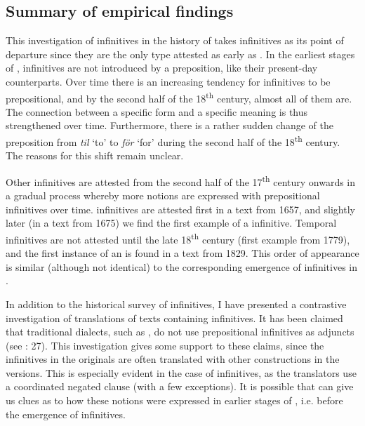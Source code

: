 \documentclass[output=paper]{langscibook}
\begin{document}
\subsection{Summary of empirical findings}\label{sec:kalm:4.4}


This investigation of  infinitives in the history of  takes  infinitives as its point of departure since they are the only type attested as early as . In the earliest stages of ,  infinitives are not introduced by a preposition, like their present-day counterparts. Over time there is an increasing tendency for  infinitives to be prepositional, and by the second half of the 18\textsuperscript{th} century, almost all of them are. The connection between a specific form and a specific meaning is thus strengthened over time. Furthermore, there is a rather sudden change of the  preposition from \textit{til} ‘to’ to \textit{för} ‘for’ during the second half of the 18\textsuperscript{th} century. The reasons for this shift remain unclear. 



Other  infinitives are attested from the second half of the 17\textsuperscript{th} century onwards in a gradual process whereby more  notions are expressed with prepositional infinitives over time.  infinitives are attested first in a text from 1657, and slightly later (in a text from 1675) we find the first example of a  infinitive. Temporal infinitives are not attested until the late 18\textsuperscript{th} century (first example from 1779), and the first instance of an  is found in a text from 1829. This order of appearance is similar (although not identical) to the corresponding emergence of  infinitives in . 



In addition to the historical survey of  infinitives, I have presented a contrastive investigation of  translations of  texts containing  infinitives. It has been claimed that traditional dialects, such as , do not use prepositional infinitives as  adjuncts (see \citealt{Holm1967}: 27). This investigation gives some support to these claims, since the  infinitives in the  originals are often translated with other constructions in the  versions. This is especially evident in the case of  infinitives, as the translators use a coordinated negated clause (with a few exceptions). It is possible that  can give us clues as to how these  notions were expressed in earlier stages of , i.e. before the emergence of  infinitives. 
\end{document}
